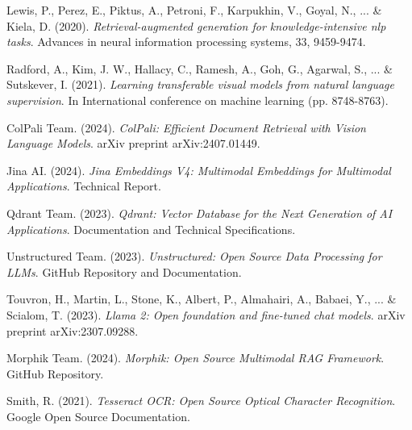 \documentclass[12pt,a4paper]{article}
\begin{document}

\begin{thebibliography}{9}

Lewis, P., Perez, E., Piktus, A., Petroni, F., Karpukhin, V., Goyal, N., ... \& Kiela, D. (2020). 
\textit{Retrieval-augmented generation for knowledge-intensive nlp tasks}. 
Advances in neural information processing systems, 33, 9459-9474.

Radford, A., Kim, J. W., Hallacy, C., Ramesh, A., Goh, G., Agarwal, S., ... \& Sutskever, I. (2021). 
\textit{Learning transferable visual models from natural language supervision}. 
In International conference on machine learning (pp. 8748-8763).

ColPali Team. (2024). 
\textit{ColPali: Efficient Document Retrieval with Vision Language Models}. 
arXiv preprint arXiv:2407.01449.

Jina AI. (2024). 
\textit{Jina Embeddings V4: Multimodal Embeddings for Multimodal Applications}. 
Technical Report.

Qdrant Team. (2023). 
\textit{Qdrant: Vector Database for the Next Generation of AI Applications}. 
Documentation and Technical Specifications.

Unstructured Team. (2023). 
\textit{Unstructured: Open Source Data Processing for LLMs}. 
GitHub Repository and Documentation.

Touvron, H., Martin, L., Stone, K., Albert, P., Almahairi, A., Babaei, Y., ... \& Scialom, T. (2023). 
\textit{Llama 2: Open foundation and fine-tuned chat models}. 
arXiv preprint arXiv:2307.09288.

Morphik Team. (2024). 
\textit{Morphik: Open Source Multimodal RAG Framework}. 
GitHub Repository.

Smith, R. (2021). 
\textit{Tesseract OCR: Open Source Optical Character Recognition}. 
Google Open Source Documentation.

\end{thebibliography}
\end{document}
